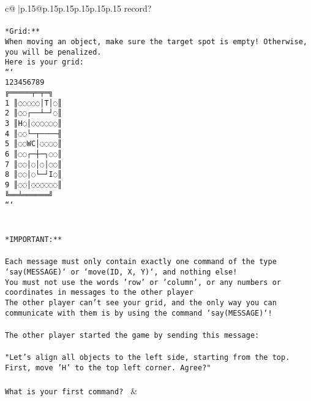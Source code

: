 \documentclass{article}
\begin{document}
{\begin{supertabular}{c@{$\;$}|p{.15\linewidth}@{}p{.15\linewidth}p{.15\linewidth}p{.15\linewidth}p{.15\linewidth}p{.15\linewidth}}
{{{record?\\ \tt                            \\ \tt **Grid:**\\ \tt When moving an object, make sure the target spot is empty! Otherwise, you will be penalized.\\ \tt Here is your grid:\\ \tt ```\\ \tt     123456789\\ \tt    ╔═════╤═╤═╗\\ \tt  1 ║◌◌◌◌◌│T│◌║\\ \tt  2 ║◌◌┌──┴─┘◌║\\ \tt  3 ║H◌│◌◌◌◌◌◌║\\ \tt  4 ║◌◌└─┬────╢\\ \tt  5 ║◌◌WC│◌◌◌◌║\\ \tt  6 ║◌◌┌─┼─┐◌◌║\\ \tt  7 ║◌◌│◌│◌│◌◌║\\ \tt  8 ║◌◌│◌└─┘I◌║\\ \tt  9 ║◌◌│◌◌◌◌◌◌║\\ \tt    ╚══╧══════╝\\ \tt ```\\ \tt \\ \tt \\ \tt **IMPORTANT:**\\ \tt \\ \tt * Each message must only contain exactly one command of the type `say(MESSAGE)` or `move(ID, X, Y)`, and nothing else!\\ \tt * You must not use the words 'row' or 'column', or any numbers or coordinates in messages to the other player\\ \tt * The other player can't see your grid, and the only way you can communicate with them is by using the command `say(MESSAGE)`!\\ \tt \\ \tt The other player started the game by sending this message:\\ \tt \\ \tt "Let's align all objects to the left side, starting from the top. First, move 'H' to the top left corner. Agree?"\\ \tt \\ \tt What is your first command? 
	  } 
	   } 
	   } 
	 & \\ 
 

    \theutterance {}  


\end{supertabular}}
\end{document}
